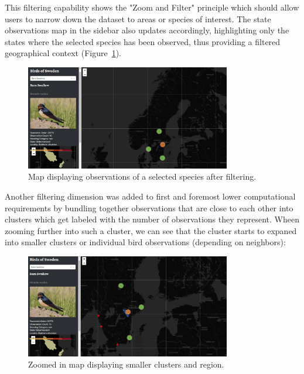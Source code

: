 This filtering capability shows the "Zoom and Filter" principle which should allow users to narrow down the dataset to areas or species of interest. The state observations map in the sidebar also updates accordingly, highlighting only the states where the selected species has been observed, thus providing a filtered geographical context (Figure~\ref{fig:filtered_map}).

\begin{figure}[h] 
    \centering 
    \includegraphics[width=0.8\textwidth]{figures/species_details.jpg} 
    \caption{Map displaying observations of a selected species after filtering.} 
    \label{fig:filtered_map} 
\end{figure}

Another filtering dimension was added to first and foremost lower computational requirements by bundling together observations that are close to each other into clusters which get labeled with the number of observations they represent. Wheen zooming further into such a cluster, we can see that the cluster starts to expaned into smaller clusters or individual bird observations (depending on neighbors):

\begin{figure}[h] 
    \centering 
    \includegraphics[width=0.8\textwidth]{figures/zoom_2.jpg} 
    \caption{Zoomed in map displaying smaller clusters and region.} 
    \label{fig:zoomed_map2} 
\end{figure}

